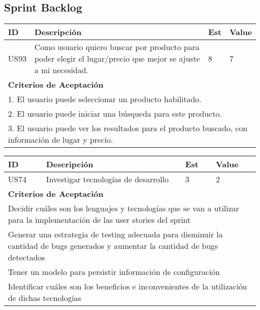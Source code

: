 \documentclass[a4paper,8pt]{article}
\begin{document}
\subsection{Sprint Backlog}

\bigskip
\center
\begin{tabular}{|p{1cm}|p{10cm}|p{1cm}|p{1cm}|}
\hline
\hline
\textbf{ID}&\textbf{Descripción}&\textbf{Est}&\textbf{Value}\\
\hline
\hline
US93&Como usuario quiero buscar por producto para poder elegir el lugar/precio que mejor se ajuste a mi necesidad.& 8& 7\\
\hline
\hline
\multicolumn{4}{|p{13cm}|}{ \textbf{Criterios de Aceptación}} \\
\hline
\hline
\multicolumn{4}{|p{13cm}|}{1. El usuario puede seleccionar un producto habilitado.}\\
\multicolumn{4}{|p{13cm}|}{2.  El usuario puede iniciar una búsqueda para este producto.}\\
\multicolumn{4}{|p{13cm}|}{3. El usuario puede ver los resultados para el producto buscado, con información de lugar y precio.}\\
\hline
\hline
\end{tabular}

\bigskip
\begin{tabular}{|p{1cm}|p{10cm}|p{1cm}|p{1cm}|}
\hline
\hline
\textbf{ID}&\textbf{Descripción}&\textbf{Est}&\textbf{Value}\\
\hline
\hline
US74&Investigar tecnologías de desarrollo&3&2\\
\hline
\hline
\multicolumn{4}{|p{13cm}|}{ \textbf{Criterios de Aceptación}} \\
\hline
\hline
\multicolumn{4}{|p{13cm}|}{Decidir cuáles son los lenguajes y tecnologías que se van a utilizar para la implementación de las user stories del sprint}\\
\multicolumn{4}{|p{13cm}|}{Generar una estrategia de testing adecuada para disminuir la cantidad de bugs generados y aumentar la cantidad de bugs detectados}\\
\multicolumn{4}{|p{13cm}|}{Tener un modelo para persistir información de configuración}\\
\multicolumn{4}{|p{13cm}|}{Identificar cuáles son los beneficios e inconvenientes de la utilización de dichas tecnologías}\\
\hline
\hline
\end{tabular}
\end{document}
